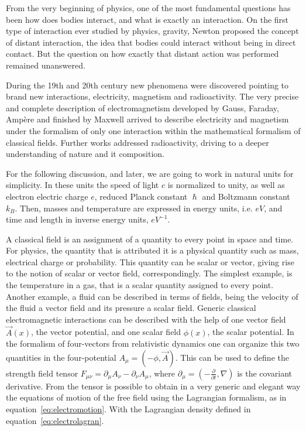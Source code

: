 From the very beginning of physics, one of the most fundamental questions has been how does bodies interact, and what is exactly an interaction. On the first type of interaction ever studied by physics, gravity, Newton proposed the concept of distant interaction, the idea that bodies could interact without being in direct contact. But the question on how exactly that distant action was performed remained unanswered. 

During the 19th and 20th century new phenomena were discovered pointing to brand new interactions, electricity, magnetism and radioactivity. The very precise and complete description of electromagnetism developed by Gauss, Faraday, Amp\`{e}re and finished by Maxwell arrived to describe electricity and magnetism under the formalism of only one interaction within the mathematical formalism of classical fields. Further works addressed radioactivity, driving to a deeper understanding of nature and it composition.

For the following discussion, and later, we are going to work in natural units for simplicity. In these units the speed of light $c$ is normalized to unity, as well as electron electric charge $e$, reduced Planck constant $\hslash$ and Boltzmann constant $k_{B}$. Then, masses and temperature are expressed in energy units, i.e. $eV$, and time and length in inverse energy units, $eV^{-1}$.

A classical field is an assignment of a quantity to every point in space and time. For physics, the quantity that is attributed it is a physical quantity such as mass, electrical charge or probability. This quantity can be scalar or vector, giving rise to the notion of scalar or vector field, correspondingly. The simplest example, is the temperature in a gas, that is a scalar quantity assigned to every point. Another example, a fluid can be described in terms of fields, being the velocity of the fluid a vector field and its pressure a scalar field. Generic classical electromagnetic interactions can be described with the help of one vector field $\vec{A}(x)$, the vector potential, and one scalar field $\phi(x)$, the scalar potential. In the formalism of four-vectors from relativistic dynamics one can organize this two quantities in the four-potential $A_{\mu}=(-\phi,\vec{A})$. This can be used to define the strength field tensor $F_{\mu\nu}=\partial_{\mu}A_{\nu}-\partial_{\nu}A_{\mu}$, where $\partial_{\mu}=\left( -\frac{\partial}{\partial t},\nabla\right)$ is the covariant derivative. From the tensor is possible to obtain in a very generic and elegant way the equations of motion of the free field using the Lagrangian formalism, as in equation~\ref{eq:electromotion}. With the Lagrangian density defined in equation~\ref{eq:electrolagran}.

